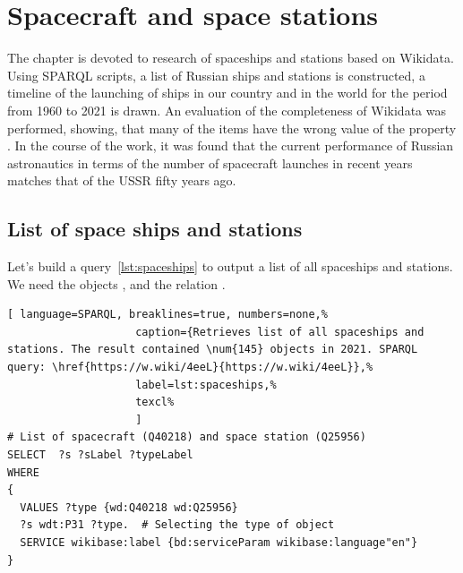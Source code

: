 
\setchapterpreamble[u]{\margintoc}
\chapter{Spacecraft and space stations}

The chapter is devoted to research of spaceships and stations based on Wikidata. 
Using SPARQL scripts, a list of Russian ships and stations is constructed, 
a timeline of the launching of ships in our country and in the world for the period from 1960 to 2021 is drawn. 
An evaluation of the completeness of Wikidata was performed, showing, 
that many of the items have the wrong value of the property 
. In the course of the work, it was found that the current performance of Russian astronautics in terms of the number of spacecraft launches in recent years matches that of the USSR fifty years ago. 

\section{List of space ships and stations}
Let's build a query~\ref{lst:spaceships} to output a list of all spaceships and stations. 
We need the objects , 
 and the relation . 

\begin{lstlisting}[ language=SPARQL, breaklines=true, numbers=none,%
                    caption={Retrieves list of all spaceships and stations. The result contained \num{145} objects in 2021. SPARQL query: \href{https://w.wiki/4eeL}{https://w.wiki/4eeL}},%
                    label=lst:spaceships,%
                    texcl%
                    ]
# List of spacecraft (Q40218) and space station (Q25956)
SELECT  ?s ?sLabel ?typeLabel
WHERE
{
  VALUES ?type {wd:Q40218 wd:Q25956}
  ?s wdt:P31 ?type.  # Selecting the type of object
  SERVICE wikibase:label {bd:serviceParam wikibase:language"en"}
}
\end{lstlisting}%

